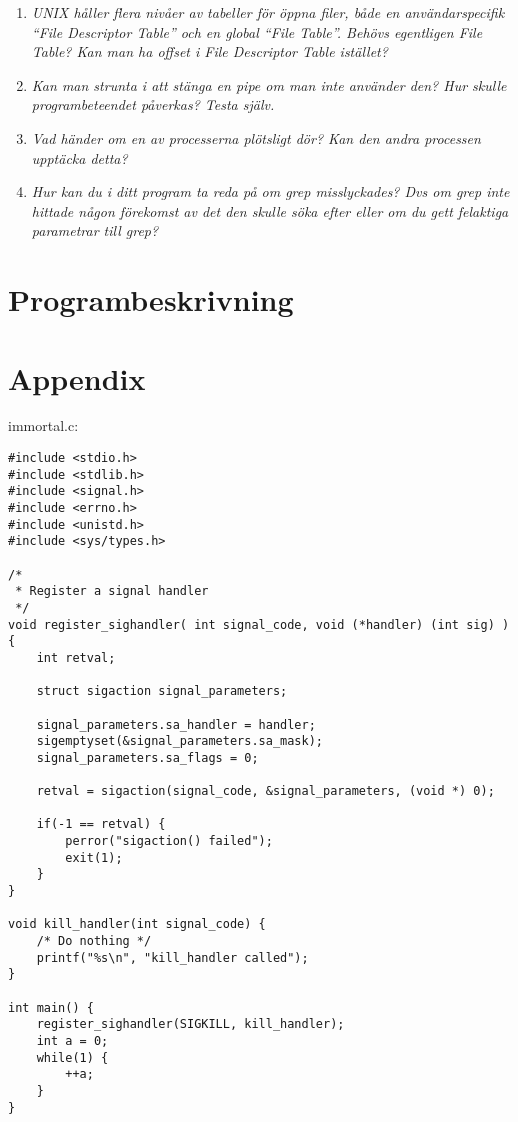 \documentclass[paper=a4, fontsize=11pt]{scrartcl} %
\numberwithin{equation}{section} %
\numberwithin{figure}{section} %
\numberwithin{table}{section} %
\begin{document}
\begin{enumerate}[1)]
\item \emph{UNIX håller flera nivåer av tabeller för öppna filer, både en användarspecifik “File Descriptor Table” och en global “File Table”. Behövs egentligen File Table? Kan man ha offset i File Descriptor Table istället?}


\item \emph{Kan man strunta i att stänga en pipe om man inte använder den? Hur skulle programbeteendet påverkas? Testa själv.}


\item \emph{Vad händer om en av processerna plötsligt dör? Kan den andra processen upptäcka detta?}


\item \emph{Hur kan du i ditt program ta reda på om grep misslyckades? Dvs om grep inte hittade någon förekomst av det den skulle söka efter eller om du gett felaktiga parametrar till grep?}

\end{enumerate}

\section{Programbeskrivning}

\newpage
\section*{Appendix}
immortal.c:\\

\begin{verbatim}
#include <stdio.h>
#include <stdlib.h>
#include <signal.h>
#include <errno.h>
#include <unistd.h>
#include <sys/types.h>

/*
 * Register a signal handler
 */
void register_sighandler( int signal_code, void (*handler) (int sig) )  {
    int retval;

    struct sigaction signal_parameters;

    signal_parameters.sa_handler = handler;
    sigemptyset(&signal_parameters.sa_mask);
    signal_parameters.sa_flags = 0;

    retval = sigaction(signal_code, &signal_parameters, (void *) 0);

    if(-1 == retval) {
        perror("sigaction() failed");
        exit(1);
    }
}

void kill_handler(int signal_code) {
    /* Do nothing */
    printf("%s\n", "kill_handler called");
}

int main() {
    register_sighandler(SIGKILL, kill_handler);
    int a = 0;
    while(1) {
        ++a;
    }
}
\end{verbatim}
\newpage
\end{document}
